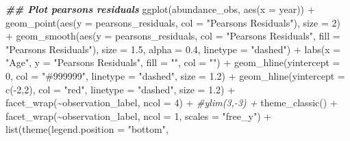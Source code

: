 \documentclass[
]{book}
\newenvironment{Shaded}{\begin{snugshade}}{\end{snugshade}}
\newcommand{\AttributeTok}[1]{\textcolor[rgb]{0.77,0.63,0.00}{#1}}
\newcommand{\CommentTok}[1]{\textcolor[rgb]{0.56,0.35,0.01}{\textit{#1}}}
\newcommand{\DecValTok}[1]{\textcolor[rgb]{0.00,0.00,0.81}{#1}}
\newcommand{\DocumentationTok}[1]{\textcolor[rgb]{0.56,0.35,0.01}{\textbf{\textit{#1}}}}
\newcommand{\FloatTok}[1]{\textcolor[rgb]{0.00,0.00,0.81}{#1}}
\newcommand{\FunctionTok}[1]{\textcolor[rgb]{0.00,0.00,0.00}{#1}}
\newcommand{\NormalTok}[1]{#1}
\newcommand{\SpecialCharTok}[1]{\textcolor[rgb]{0.00,0.00,0.00}{#1}}
\newcommand{\StringTok}[1]{\textcolor[rgb]{0.31,0.60,0.02}{#1}}
\begin{document}
\begin{Shaded}
\begin{Highlighting}[]
\DocumentationTok{\#\# Plot pearsons residuals}
\FunctionTok{ggplot}\NormalTok{(abundance\_obs, }\FunctionTok{aes}\NormalTok{(}\AttributeTok{x =}\NormalTok{ year)) }\SpecialCharTok{+}
  \FunctionTok{geom\_point}\NormalTok{(}\FunctionTok{aes}\NormalTok{(}\AttributeTok{y =}\NormalTok{ pearsons\_residuals, }\AttributeTok{col =} \StringTok{"Pearson\textquotesingle{}s Residuals"}\NormalTok{), }
             \AttributeTok{size =} \DecValTok{2}\NormalTok{) }\SpecialCharTok{+}
  \FunctionTok{geom\_smooth}\NormalTok{(}\FunctionTok{aes}\NormalTok{(}\AttributeTok{y =}\NormalTok{ pearsons\_residuals, }\AttributeTok{col =} \StringTok{"Pearson\textquotesingle{}s Residuals"}\NormalTok{, }
                  \AttributeTok{fill =} \StringTok{"Pearson\textquotesingle{}s Residuals"}\NormalTok{), }\AttributeTok{size =} \FloatTok{1.5}\NormalTok{, }\AttributeTok{alpha =} \FloatTok{0.4}\NormalTok{,}
              \AttributeTok{linetype =} \StringTok{"dashed"}\NormalTok{) }\SpecialCharTok{+}
  \FunctionTok{labs}\NormalTok{(}\AttributeTok{x =} \StringTok{"Age"}\NormalTok{, }\AttributeTok{y =} \StringTok{"Pearson\textquotesingle{}s Residuals"}\NormalTok{, }\AttributeTok{fill =} \StringTok{""}\NormalTok{, }\AttributeTok{col =} \StringTok{""}\NormalTok{) }\SpecialCharTok{+}
  \FunctionTok{geom\_hline}\NormalTok{(}\AttributeTok{yintercept =} \DecValTok{0}\NormalTok{, }\AttributeTok{col =} \StringTok{"\#999999"}\NormalTok{, }\AttributeTok{linetype =} \StringTok{"dashed"}\NormalTok{, }
             \AttributeTok{size =} \FloatTok{1.2}\NormalTok{) }\SpecialCharTok{+}
  \FunctionTok{geom\_hline}\NormalTok{(}\AttributeTok{yintercept =} \FunctionTok{c}\NormalTok{(}\SpecialCharTok{{-}}\DecValTok{2}\NormalTok{,}\DecValTok{2}\NormalTok{), }\AttributeTok{col =} \StringTok{"red"}\NormalTok{, }\AttributeTok{linetype =} \StringTok{"dashed"}\NormalTok{, }
             \AttributeTok{size =} \FloatTok{1.2}\NormalTok{) }\SpecialCharTok{+} 
  \FunctionTok{facet\_wrap}\NormalTok{(}\SpecialCharTok{\textasciitilde{}}\NormalTok{observation\_label, }\AttributeTok{ncol =} \DecValTok{4}\NormalTok{) }\SpecialCharTok{+}
  \CommentTok{\#ylim(3,{-}3) +}
  \FunctionTok{theme\_classic}\NormalTok{() }\SpecialCharTok{+}
  \FunctionTok{facet\_wrap}\NormalTok{(}\SpecialCharTok{\textasciitilde{}}\NormalTok{observation\_label, }\AttributeTok{ncol =} \DecValTok{1}\NormalTok{, }\AttributeTok{scales =} \StringTok{"free\_y"}\NormalTok{) }\SpecialCharTok{+}
  \FunctionTok{list}\NormalTok{(}\FunctionTok{theme}\NormalTok{(}\AttributeTok{legend.position =} \StringTok{"bottom"}\NormalTok{, }

\end{Highlighting}
\end{Shaded}
\end{document}
